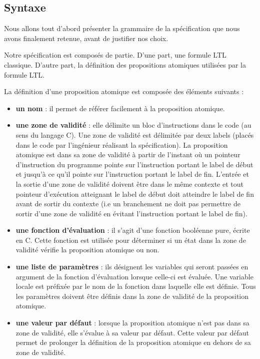 \subsection{Syntaxe}

Nous allons tout d'abord présenter la grammaire de la spécification que
nous avons finalement retenue, avant de justifier nos choix.

Notre spécification est composés de partie. D'une part, une formule LTL
classique. D'autre part, la définition des propositions atomiques utilisées
par la formule LTL.

La définition d'une proposition atomique est composée des éléments suivants :

\begin{itemize}
\item
  \textbf{un nom} : il permet de référer facilement à la proposition atomique.
\item
  \textbf{une zone de validité} : elle délimite un bloc d'instructions dans
  le code (au sens du langage C). Une zone de validité est délimitée par deux
  labels (placés dans le code par l'ingénieur réalisant la spécification). La
  proposition atomique est dans sa zone de validité à partir de l'instant où un
  pointeur d'instruction du programme pointe sur l'instruction portant le label
  de début et jusqu'à ce qu'il pointe sur l'instruction portant le label de fin.
  L'entrée et la sortie d'une zone de validité doivent être dans le même
  contexte et tout pointeur d'exécution atteignant le label de début doit
  atteindre le label de fin avant de sortir du contexte (i.e un branchement ne
  doit pas permettre de sortir d'une zone de validité en évitant l'instruction
  portant le label de fin).
\item
  \textbf{une fonction d'évaluation} : il s'agit d'une fonction booléenne pure,
  écrite en C. Cette fonction est utilisée pour déterminer si un état
  dans la zone de validité vérifie la proposition atomique ou non.
\item
\textbf{une liste de paramètres} : ils désignent les variables qui seront
  passées en argument de la fonction d'évaluation lorsque celle-ci est évaluée.
  Une variable locale est préfixée par le nom de la fonction dans laquelle elle
  est définie. Tous les paramètres doivent être définis dans la zone de validité
  de la proposition atomique.
\item
  \textbf{une valeur par défaut} : lorsque la proposition atomique n'est pas dans
  sa zone de validité, elle s'évalue à sa valeur par défaut. Cette valeur par
  défaut permet de prolonger la définition de la proposition atomique en dehors
  de sa zone de validité.
\end{itemize}

